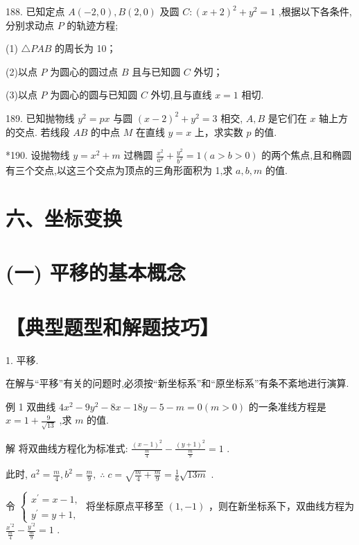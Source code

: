 \documentclass[10pt]{article}
\begin{document}
188. 已知定点 \(A\left( {-2,0}\right) ,B\left( {2,0}\right)\) 及圆 \(C : {\left( x + 2\right) }^{2} + {y}^{2} = 1\) ,根据以下各条件,分别求动点 \(P\) 的轨迹方程;

(1) \(\bigtriangleup  {PAB}\) 的周长为 10；

(2)以点 \(P\) 为圆心的圆过点 \(B\) 且与已知圆 \(C\) 外切；

(3)以点 \(P\) 为圆心的圆与已知圆 \(C\) 外切,且与直线 \(x = 1\) 相切.

189. 已知抛物线 \({y}^{2} = {px}\) 与圆 \({\left( x - 2\right) }^{2} + {y}^{2} = 3\) 相交, \(A,B\) 是它们在 \(x\) 轴上方的交点. 若线段 \({AB}\) 的中点 \(M\) 在直线 \(y = x\) 上，求实数 \(p\) 的值.

*190. 设抛物线 \(y = {x}^{2} + m\) 过椭圆 \(\frac{{x}^{2}}{{a}^{2}} + \frac{{y}^{2}}{{b}^{2}} = 1\left( {a > b > 0}\right)\) 的两个焦点,且和椭圆有三个交点,以这三个交点为顶点的三角形面积为 1,求 \(a,b,m\) 的值.

\section*{六、坐标变换}

\section*{(一) 平移的基本概念}

\section*{【典型题型和解题技巧】}

1. 平移.

在解与“平移”有关的问题时,必须按“新坐标系”和“原坐标系”有条不紊地进行演算.

例 1 双曲线 \(4{x}^{2} - 9{y}^{2} - {8x} - {18y} - 5 - m = 0\left( {m > 0}\right)\) 的一条准线方程是 \(x = 1 + \frac{9}{\sqrt{13}}\) ,求 \(m\) 的值.

解 将双曲线方程化为标准式: \(\frac{{\left( x - 1\right) }^{2}}{\frac{m}{4}} - \frac{{\left( y + 1\right) }^{2}}{\frac{m}{9}} = 1\) .

此时, \({a}^{2} = \frac{m}{4},{b}^{2} = \frac{m}{9},\;\therefore \;c = \sqrt{\frac{m}{4} + \frac{m}{9}} = \frac{1}{6}\sqrt{13m}\) .

令 \(\left\{  \begin{array}{l} {x}^{\prime } = x - 1, \\  {y}^{\prime } = y + 1, \end{array}\right.\) 将坐标原点平移至 \(\left( {1, - 1}\right)\) ，则在新坐标系下，双曲线方程为 \(\frac{{x}^{\prime 2}}{\frac{m}{4}} - \frac{{y}^{\prime 2}}{\frac{m}{9}} = 1\) .
\end{document}
